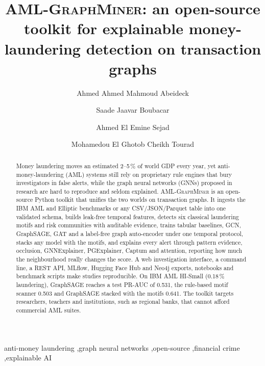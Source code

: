 \documentclass[review,12pt]{elsarticle}%
\newcommand{\amlgm}{\textsc{AML-GraphMiner}}
\begin{document}
\begin{frontmatter}

\title{\amlgm: an open-source toolkit for explainable money-laundering detection on transaction graphs}

\author[fst]{Ahmed Ahmed Mahmoud Abeideck}
\author[fst]{Saade Jaavar Boubacar}
\author[iscae]{Ahmed El Emine Sejad}
\author[urk]{Mohamedou El Ghotob Cheikh Tourad}
\address[fst]{Faculty of Sciences and Techniques, University of Nouakchott, Mauritania}
\address[urk]{Al-Khawarizmi Research Unit, University of Nouakchott, Mauritania}
\address[iscae]{Higher Institute of Accounting and Business Administration (ISCAE), Nouakchott, Mauritania}

\begin{abstract}
Money laundering moves an estimated 2--5\,\% of world GDP every year, yet anti-money-laundering
(AML) systems still rely on proprietary rule engines that bury investigators in false alerts, while
the graph neural networks (GNNs) proposed in research are hard to reproduce and seldom explained.
\amlgm{} is an open-source Python toolkit that unifies the two worlds on transaction graphs. It
ingests the IBM AML and Elliptic benchmarks or any CSV/JSON/Parquet table into one validated schema,
builds leak-free temporal features, detects six classical laundering motifs and risk communities
with auditable evidence, trains tabular baselines, GCN, GraphSAGE, GAT and a label-free graph
auto-encoder under one temporal protocol, stacks any model with the motifs, and explains every alert
through pattern evidence, occlusion, GNNExplainer, PGExplainer, Captum and attention, reporting how
much the neighbourhood really changes the score. A web investigation interface, a command line, a
REST API, MLflow, Hugging Face Hub and Neo4j exports, notebooks and benchmark scripts make studies
reproducible. On IBM AML HI-Small (0.18\,\% laundering), GraphSAGE reaches a test PR-AUC of 0.531,
the rule-based motif scanner 0.503 and GraphSAGE stacked with the motifs 0.641. The toolkit targets researchers, teachers and institutions, such as regional banks, that
cannot afford commercial AML suites.
\end{abstract}

\begin{keyword}
anti-money laundering \sep graph neural networks \sep open-source \sep financial crime \sep explainable AI
\end{keyword}

\end{frontmatter}
\end{document}
